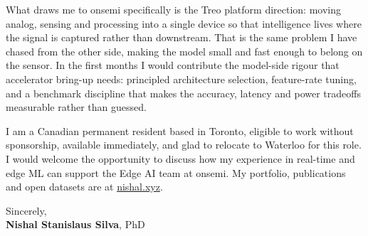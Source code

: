 \documentclass[11pt]{article}
\newcommand{\clName}{Nishal Stanislaus Silva}
\newcommand{\clSite}{https://nishal.xyz}
\newcommand{\clTeam}{the Edge AI team}
\begin{document}
What draws me to onsemi specifically is the Treo platform direction: moving analog, sensing and processing into a single device so that intelligence lives where the signal is captured rather than downstream. That is the same problem I have chased from the other side, making the model small and fast enough to belong on the sensor. In the first months I would contribute the model-side rigour that accelerator bring-up needs: principled architecture selection, feature-rate tuning, and a benchmark discipline that makes the accuracy, latency and power tradeoffs measurable rather than guessed.

I am a Canadian permanent resident based in Toronto, eligible to work without sponsorship, available immediately, and glad to relocate to Waterloo for this role. I would welcome the opportunity to discuss how my experience in real-time and edge ML can support \clTeam{} at onsemi. My portfolio, publications and open datasets are at \href{\clSite}{nishal.xyz}.

\vspace{12pt}
Sincerely,\\[2pt]
\textbf{\clName}, PhD
\end{document}
